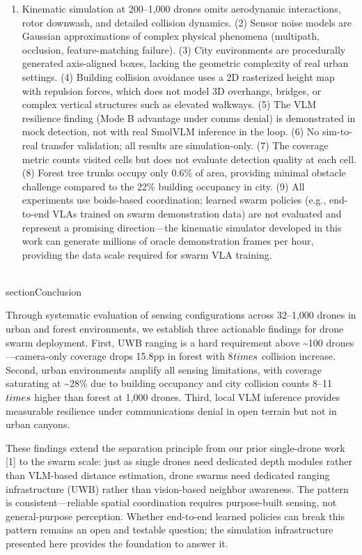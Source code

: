 \documentclass[conference]{IEEEtran}
\begin{document}
\begin{enumerate}
\def\labelenumi{(\arabic{enumi})}
\tightlist
\item
  Kinematic simulation at 200--1,000 drones omits aerodynamic
  interactions, rotor downwash, and detailed collision dynamics. (2)
  Sensor noise models are Gaussian approximations of complex physical
  phenomena (multipath, occlusion, feature-matching failure). (3) City
  environments are procedurally generated axis-aligned boxes, lacking
  the geometric complexity of real urban settings. (4) Building
  collision avoidance uses a 2D rasterized height map with repulsion
  forces, which does not model 3D overhangs, bridges, or complex
  vertical structures such as elevated walkways. (5) The VLM resilience
  finding (Mode B advantage under comms denial) is demonstrated in mock
  detection, not with real SmolVLM inference in the loop. (6) No
  sim-to-real transfer validation; all results are simulation-only. (7)
  The coverage metric counts visited cells but does not evaluate
  detection quality at each cell. (8) Forest tree trunks occupy only
  0.6\% of area, providing minimal obstacle challenge compared to the
  22\% building occupancy in city. (9) All experiments use boids-based
  coordination; learned swarm policies (e.g., end-to-end VLAs trained on
  swarm demonstration data) are not evaluated and represent a promising
  direction---the kinematic simulator developed in this work can
  generate millions of oracle demonstration frames per hour, providing
  the data scale required for swarm VLA training.
\end{enumerate}

\\section{Conclusion}\label{x.-conclusion}

Through systematic evaluation of sensing configurations across 32--1,000
drones in urban and forest environments, we establish three actionable
findings for drone swarm deployment. First, UWB ranging is a hard
requirement above \textasciitilde100 drones---camera-only coverage drops
15.8pp in forest with 8$\\times$ collision increase. Second, urban environments
amplify all sensing limitations, with coverage saturating at
\textasciitilde28\% due to building occupancy and city collision counts
8--11$\\times$ higher than forest at 1,000 drones. Third, local VLM inference
provides measurable resilience under communications denial in open
terrain but not in urban canyons.

These findings extend the separation principle from our prior
single-drone work [1] to the swarm scale: just as single drones need
dedicated depth modules rather than VLM-based distance estimation, drone
swarms need dedicated ranging infrastructure (UWB) rather than
vision-based neighbor awareness. The pattern is consistent---reliable
spatial coordination requires purpose-built sensing, not general-purpose
perception. Whether end-to-end learned policies can break this pattern
remains an open and testable question; the simulation infrastructure
presented here provides the foundation to answer it.
\end{document}

